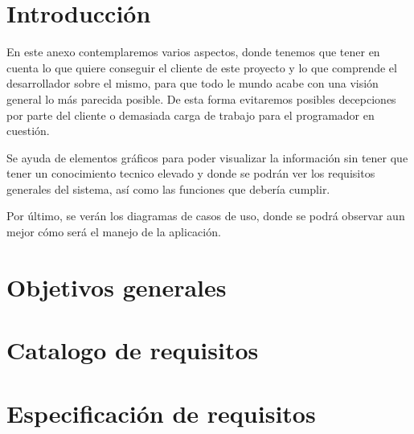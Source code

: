 
\section{Introducción}

En este anexo contemplaremos varios aspectos, donde tenemos que tener en cuenta lo que quiere conseguir el cliente de este proyecto y lo que comprende el desarrollador sobre el mismo, para que todo le mundo acabe con una visión general lo más parecida posible. De esta forma evitaremos posibles decepciones por parte del cliente o demasiada carga de trabajo para el programador en cuestión.

Se ayuda de elementos gráficos para poder visualizar la información sin tener que tener un conocimiento tecnico elevado y donde se podrán ver los requisitos generales del sistema, así como las funciones que debería cumplir.

Por último, se verán los diagramas de casos de uso, donde se podrá observar aun mejor cómo será el manejo de la aplicación.

\section{Objetivos generales}



\section{Catalogo de requisitos}

\section{Especificación de requisitos}


